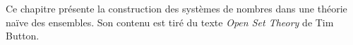 \documentclass[../../../include/open-logic-section]{subfiles}
\begin{document}

\begin{editorial}
Ce chapitre présente la construction des systèmes de nombres dans
une théorie naïve des ensembles. Son contenu est tiré du texte
\emph{Open Set Theory} de Tim Button.
\end{editorial}


\OLEndChapterHook
\end{document}
